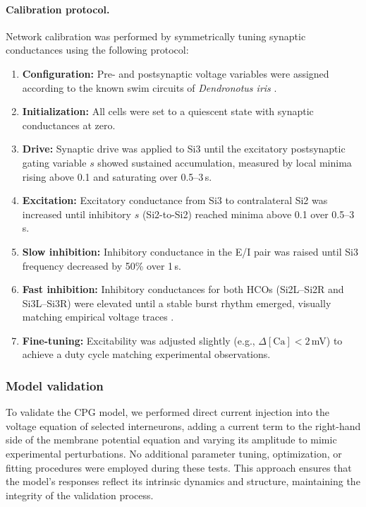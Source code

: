 \paragraph{Calibration protocol.}
Network calibration was performed by symmetrically tuning synaptic conductances using the following protocol:
\begin{enumerate}
    \item \textbf{Configuration:} Pre- and postsynaptic voltage variables were assigned according to the known swim circuits of \textit{Dendronotus iris} \cite{SakuraiKatz2016}.
    \item \textbf{Initialization:} All cells were set to a quiescent state with synaptic conductances at zero.
    \item \textbf{Drive:} Synaptic drive was applied to Si3 until the excitatory postsynaptic gating variable $s$ showed sustained accumulation, measured by local minima rising above 0.1 and saturating over 0.5--3\,s.
    \item \textbf{Excitation:} Excitatory conductance from Si3 to contralateral Si2 was increased until inhibitory $s$ (Si2-to-Si2) reached minima above 0.1 over 0.5--3\,s.
    \item \textbf{Slow inhibition:} Inhibitory conductance in the E/I pair was raised until Si3 frequency decreased by 50\% over 1\,s.
    \item \textbf{Fast inhibition:} Inhibitory conductances for both HCOs (Si2L--Si2R and Si3L--Si3R) were elevated until a stable burst rhythm emerged, visually matching empirical voltage traces \cite{SakuraiKatz2016}.
    \item \textbf{Fine-tuning:} Excitability was adjusted slightly (e.g., $\Delta[\text{Ca}] < 2$\,mV) to achieve a duty cycle matching experimental observations.
\end{enumerate}


\subsubsection*{Model validation}

To validate the CPG model, we performed direct current injection into the voltage equation of selected interneurons, adding a current term to the right-hand side of the membrane potential equation and varying its amplitude to mimic experimental perturbations.
No additional parameter tuning, optimization, or fitting procedures were employed during these tests.
This approach ensures that the model's responses reflect its intrinsic dynamics and structure, maintaining the integrity of the validation process.

